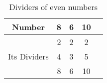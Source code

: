 \begin{table}[htbp]
\centering
\begin{tabular}{ |c|c|c|c|c| } 
\hline
Number & 8 & 6 & 10\\
\hline
\multirow{3}{4em}{Its Dividers} & 2 & 2 & 2 \\ & 4 & 3 & 5\\ & 8 & 6 & 10 \\ 
\hline
\end{tabular}
\label{tab:table_AC}
\caption{Dividers of even numbers}
\end{table}